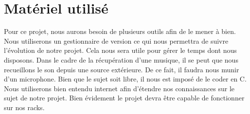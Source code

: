 \documentclass[a4paper,12pt]{article}
\begin{document}
\section{Matériel utilisé}

Pour ce projet, nous aurons besoin de plusieurs outils afin de le mener à bien. Nous utiliserons un gestionnaire de version ce qui nous permettra de suivre l'évolution de notre projet. Cela nous sera utile pour gérer le temps dont nous disposons. Dans le cadre de la récupération d'une musique, il se peut que nous recueillons le son depuis une source extérieure. De ce fait, il faudra nous munir d'un microphone. Bien que le sujet soit libre, il nous est imposé de le coder en C. Nous utiliserons bien entendu internet afin d'étendre nos connaissances sur le sujet de notre projet. Bien évidement le projet devra être capable de fonctionner sur nos racks.
\end{document}
